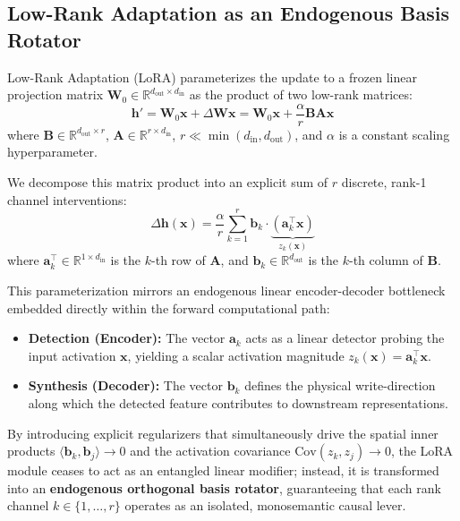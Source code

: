 \documentclass[10pt,twocolumn,letterpaper]{article}
\begin{document}
\subsection{Low-Rank Adaptation as an Endogenous Basis Rotator}
\label{subsec:lora_rotator}

Low-Rank Adaptation (LoRA) parameterizes the update to a frozen linear projection matrix $\bm{W}_0 \in \mathbb{R}^{d_{\text{out}} \times d_{\text{in}}}$ as the product of two low-rank matrices:
\begin{equation}
    \bm{h}' = \bm{W}_0 \bm{x} + \Delta \bm{W}\bm{x} = \bm{W}_0 \bm{x} + \frac{\alpha}{r} \bm{B}\bm{A}\bm{x}
\end{equation}
where $\bm{B} \in \mathbb{R}^{d_{\text{out}} \times r}$, $\bm{A} \in \mathbb{R}^{r \times d_{\text{in}}}$, $r \ll \min(d_{\text{in}}, d_{\text{out}})$, and $\alpha$ is a constant scaling hyperparameter.

We decompose this matrix product into an explicit sum of $r$ discrete, rank-1 channel interventions:
\begin{equation}
    \Delta \bm{h}(\bm{x}) = \frac{\alpha}{r} \sum_{k=1}^r \bm{b}_k \cdot \underbrace{\left(\bm{a}_k^\top \bm{x}\right)}_{z_k(\bm{x})}
    \label{eq:lora_channels}
\end{equation}
where $\bm{a}_k^\top \in \mathbb{R}^{1 \times d_{\text{in}}}$ is the $k$-th row of $\bm{A}$, and $\bm{b}_k \in \mathbb{R}^{d_{\text{out}}}$ is the $k$-th column of $\bm{B}$.

This parameterization mirrors an endogenous linear encoder-decoder bottleneck embedded directly within the forward computational path:
\begin{itemize}
    \item \textbf{Detection (Encoder):} The vector $\bm{a}_k$ acts as a linear detector probing the input activation $\bm{x}$, yielding a scalar activation magnitude $z_k(\bm{x}) = \bm{a}_k^\top \bm{x}$.
    \item \textbf{Synthesis (Decoder):} The vector $\bm{b}_k$ defines the physical write-direction along which the detected feature contributes to downstream representations.
\end{itemize}

By introducing explicit regularizers that simultaneously drive the spatial inner products $\langle \bm{b}_k, \bm{b}_j \rangle \to 0$ and the activation covariance $\text{Cov}(z_k, z_j) \to 0$, the LoRA module ceases to act as an entangled linear modifier; instead, it is transformed into an \textbf{endogenous orthogonal basis rotator}, guaranteeing that each rank channel $k \in \{1, \dots, r\}$ operates as an isolated, monosemantic causal lever.
\end{document}
